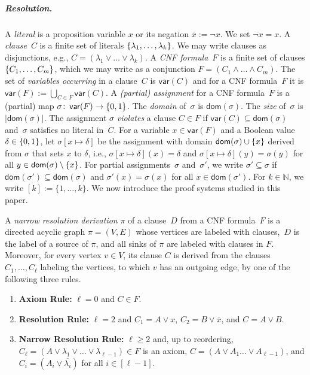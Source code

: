 \documentclass[a4paper,english, thm-restate]{lipics-v2021}
\newcommand{\defining}[1]{\emph{#1}}
\DeclarePairedDelimiter\set{\lbrace}{\rbrace}
\newcommand{\Vars}[1]{\mathsf{var}(#1)}
\newcommand{\nat}{\mathbb{N}}
\newcommand{\dom}{\mathsf{dom}}
\begin{document}
\subparagraph{Resolution.}
A \defining{literal} is a proposition variable $x$ or its negation $\overline{x} := \neg x$. We set $\overline{\neg x} = x$.
A \defining{clause}~$C$ is a finite set of literals $\set{\lambda_1,\dots, \lambda_k}$.
We may write clauses as disjunctions, e.g., $C = (\lambda_1 \lor \dots \lor \lambda_k)$. %
A \defining{CNF formula}~$F$  is a finite set of clauses $\set{C_1,\dots,C_m}$,
which we may write as a conjunction $F = (C_1 \land \dots \land C_m)$.
The set of \defining{variables occurring} in a clause~$C$ is $\Vars{C}$
and for a CNF formula~$F$ it is $\Vars{F} := \bigcup_{C \in F} \Vars{C}$.
%
A \defining{(partial) assignment} for a CNF formula~$F$ is a (partial) map
$\sigma\colon \,\Vars{F} \to \set{0,1}$.
The \defining{domain} of~$\sigma$ is $\dom(\sigma)$.
The \defining{size} of~$\sigma$ is $|\dom(\sigma)|$.
The assignment $\sigma$ \defining{violates} a clause $C \in F$
if $\Vars{C} \subseteq \dom(\sigma)$ and~$\sigma$ satisfies no literal in~$C$.
For a variable $x \in \Vars{F}$ and a Boolean value $\delta \in \set{0,1}$,
let $\sigma[x\mapsto \delta]$ be the assignment with domain $\dom(\sigma) \cup \set{x}$ derived from $\sigma$ that sets $x$ to $\delta$, i.e., $\sigma[x\mapsto \delta](x) = \delta$ and $\sigma[x\mapsto \delta](y) = \sigma(y)$ for
all $y \in \dom(\sigma) \setminus \set{x}$.
For partial assignments~$\sigma$ and~$\sigma'$, we write $\sigma' \subseteq \sigma$ if $\dom(\sigma') \subseteq \dom(\sigma)$ and $\sigma'(x) = \sigma(x)$ for all $x\in \dom(\sigma')$. 
For $k\in \nat$, we write $[k]:= \{1, \dots, k\}$.
We now  introduce the proof systems studied in this paper. 


\begin{definition}
A \defining{narrow resolution derivation} $\pi$ of a clause~$D$ from a CNF formula~$F$ is a directed acyclic graph $\pi=(V,E)$
whose vertices are labeled with clauses,~$D$ is the label of a source of $\pi$, and all sinks of $\pi$ are labeled with clauses in $F$.
Moreover, for every vertex $v \in V$, its clause $C$ is derived from the clauses $C_1,\dots, C_\ell$ labeling the vertices, to which $v$ has an outgoing edge, by one of the following three rules.
\begin{enumerate}
\item {\bf Axiom Rule:} \label{itm:axiom} $\ell = 0$ and $C \in F$.
\item {\bf Resolution Rule:} \label{itm:resolution} $\ell=2$ and $C_1 = A \vee x$, $C_2 = B \vee \overline{x}$, and $C = A \vee B$.
\item {\bf Narrow Resolution Rule:} \label{itm:narrow-resolution} 
$\ell\geq 2$ and, up to reordering, $C_\ell =(A \vee \lambda_1 \vee \dots \vee \lambda_{\ell-1}) 
\in F$ is an axiom, $C = (A \vee A_1 \dots \vee A_{\ell-1})$, and
$C_{i} = (A_i \vee 
\overline{\lambda_i})$ for all $i \in [\ell-1]$.
\end{enumerate}
\end{definition}
\end{document}
